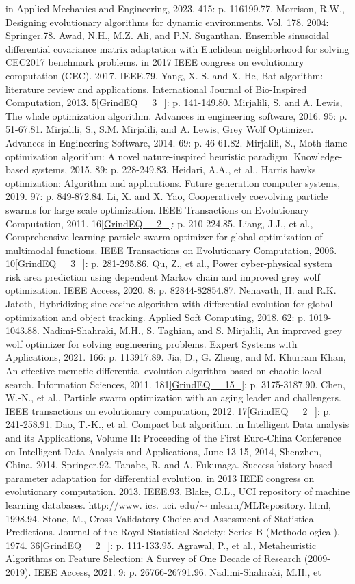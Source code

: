 \documentclass{article} %
\begin{document}
in Applied Mechanics and Engineering, 2023. 415: p. 116199.77. Morrison, R.W., Designing evolutionary algorithms for dynamic environments. Vol. 178. 2004: Springer.78. Awad, N.H., M.Z. Ali, and P.N. Suganthan. Ensemble sinusoidal differential covariance matrix adaptation with Euclidean neighborhood for solving CEC2017 benchmark problems. in 2017 IEEE congress on evolutionary computation (CEC). 2017. IEEE.79. Yang, X.-S. and X. He, Bat algorithm: literature review and applications. International Journal of Bio-Inspired Computation, 2013. 5\eqref{GrindEQ__3_}: p. 141-149.80. Mirjalili, S. and A. Lewis, The whale optimization algorithm. Advances in engineering software, 2016. 95: p. 51-67.81. Mirjalili, S., S.M. Mirjalili, and A. Lewis, Grey Wolf Optimizer. Advances in Engineering Software, 2014. 69: p. 46-61.82. Mirjalili, S., Moth-flame optimization algorithm: A novel nature-inspired heuristic paradigm. Knowledge-based systems, 2015. 89: p. 228-249.83. Heidari, A.A., et al., Harris hawks optimization: Algorithm and applications. Future generation computer systems, 2019. 97: p. 849-872.84. Li, X. and X. Yao, Cooperatively coevolving particle swarms for large scale optimization. IEEE Transactions on Evolutionary Computation, 2011. 16\eqref{GrindEQ__2_}: p. 210-224.85. Liang, J.J., et al., Comprehensive learning particle swarm optimizer for global optimization of multimodal functions. IEEE Transactions on Evolutionary Computation, 2006. 10\eqref{GrindEQ__3_}: p. 281-295.86. Qu, Z., et al., Power cyber-physical system risk area prediction using dependent Markov chain and improved grey wolf optimization. IEEE Access, 2020. 8: p. 82844-82854.87. Nenavath, H. and R.K. Jatoth, Hybridizing sine cosine algorithm with differential evolution for global optimization and object tracking. Applied Soft Computing, 2018. 62: p. 1019-1043.88. Nadimi-Shahraki, M.H., S. Taghian, and S. Mirjalili, An improved grey wolf optimizer for solving engineering problems. Expert Systems with Applications, 2021. 166: p. 113917.89. Jia, D., G. Zheng, and M. Khurram Khan, An effective memetic differential evolution algorithm based on chaotic local search. Information Sciences, 2011. 181\eqref{GrindEQ__15_}: p. 3175-3187.90. Chen, W.-N., et al., Particle swarm optimization with an aging leader and challengers. IEEE transactions on evolutionary computation, 2012. 17\eqref{GrindEQ__2_}: p. 241-258.91. Dao, T.-K., et al. Compact bat algorithm. in Intelligent Data analysis and its Applications, Volume II: Proceeding of the First Euro-China Conference on Intelligent Data Analysis and Applications, June 13-15, 2014, Shenzhen, China. 2014. Springer.92. Tanabe, R. and A. Fukunaga. Success-history based parameter adaptation for differential evolution. in 2013 IEEE congress on evolutionary computation. 2013. IEEE.93. Blake, C.L., UCI repository of machine learning databases. http://www. ics. uci. edu/$\mathrm{\sim}$ mlearn/MLRepository. html, 1998.94. Stone, M., Cross-Validatory Choice and Assessment of Statistical Predictions. Journal of the Royal Statistical Society: Series B (Methodological), 1974. 36\eqref{GrindEQ__2_}: p. 111-133.95. Agrawal, P., et al., Metaheuristic Algorithms on Feature Selection: A Survey of One Decade of Research (2009-2019). IEEE Access, 2021. 9: p. 26766-26791.96. Nadimi-Shahraki, M.H., et 
\end{document}

